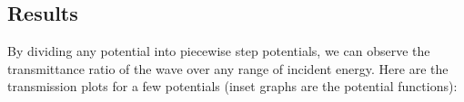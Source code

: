 \documentclass{article}
\begin{document}
\subsection{Results}
By dividing any potential into piecewise step potentials, we can observe the transmittance ratio of the wave over any range of incident energy. Here are the transmission plots for a few potentials (inset graphs are the potential functions):
\begin{figure}[h!]
\centering
{}
\qquad
{}

\end{figure}
\end{document}
